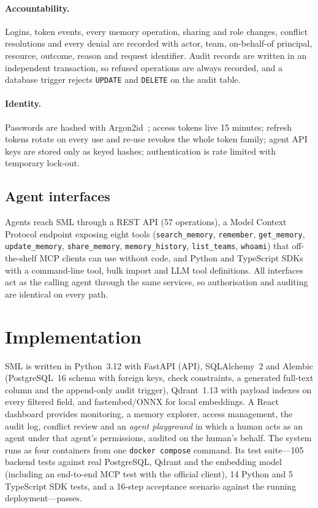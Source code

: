 \documentclass[11pt,a4paper]{article}
\theoremstyle{remark}
\newcommand{\sys}{SML}
\begin{document}
\paragraph{Accountability.} Logins, token events, every memory operation, sharing and role changes, conflict
resolutions and every denial are recorded with actor, team, on-behalf-of principal, resource, outcome, reason and
request identifier. Audit records are written in an independent transaction, so refused operations are always
recorded, and a database trigger rejects \texttt{UPDATE} and \texttt{DELETE} on the audit table.

\paragraph{Identity.} Passwords are hashed with Argon2id~\cite{biryukov2016argon2}; access tokens live 15 minutes;
refresh tokens rotate on every use and re-use revokes the whole token family; agent API keys are stored only as
keyed hashes; authentication is rate limited with temporary lock-out.

\subsection{Agent interfaces}

\begin{sloppypar}
Agents reach \sys{} through a REST API (57 operations), a Model Context Protocol endpoint exposing eight tools
(\texttt{search\_memory}, \texttt{remember}, \texttt{get\_memory}, \texttt{update\_memory}, \texttt{share\_memory},
\texttt{memory\_history}, \texttt{list\_teams}, \texttt{whoami}) that off-the-shelf MCP clients can use without code,
and Python and TypeScript SDKs with a command-line tool, bulk import and LLM tool definitions. All interfaces act as
the calling agent through the same services, so authorisation and auditing are identical on every path.
\end{sloppypar}

\section{Implementation}
\label{sec:impl}

\sys{} is written in Python~3.12 with FastAPI (API), SQLAlchemy~2 and Alembic (PostgreSQL~16 schema with foreign keys,
check constraints, a generated full-text column and the append-only audit trigger), Qdrant~1.13 with payload indexes on
every filtered field, and fastembed/ONNX for local embeddings. A React dashboard provides monitoring, a memory explorer,
access management, the audit log, conflict review and an \emph{agent playground} in which a human acts as an agent
under that agent's permissions, audited on the human's behalf. The system runs as four containers from one
\texttt{docker compose} command. Its test suite---105 backend tests against real PostgreSQL, Qdrant and the embedding
model (including an end-to-end MCP test with the official client), 14 Python and 5 TypeScript SDK tests, and a 16-step
acceptance scenario against the running deployment---passes.
\end{document}
